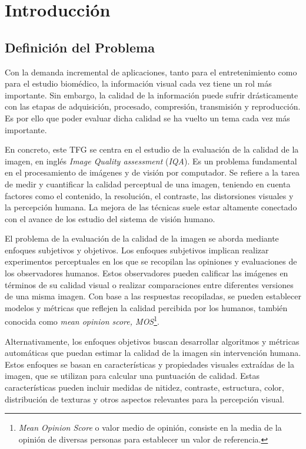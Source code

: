 \chapter{Introducción}
\section{Definición del Problema}   
Con la demanda incremental de aplicaciones, tanto para el entretenimiento 
como para el estudio biomédico, la información visual cada vez tiene un rol 
más importante. Sin embargo, la calidad de la información puede sufrir drásticamente
con las etapas de adquisición, procesado, compresión, transmisión y reproducción.
Es por ello que poder evaluar dicha calidad se ha vuelto un 
tema cada vez más importante\cite{VisualMedicalQualityBook}.

En concreto, este TFG se centra en el estudio de la evaluación de la calidad de la imagen,
en inglés \emph{Image Quality assessment} (\emph{IQA})\cite{MinkowskiFailure}.
Es un problema fundamental en el procesamiento de imágenes y de visión 
por computador. Se refiere a la tarea de medir y cuantificar 
la calidad perceptual de una imagen, 
teniendo en cuenta factores como el contenido, la resolución, 
el contraste, las distorsiones visuales y la percepción humana. 
La mejora de las técnicas suele estar altamente conectado con el avance 
de los estudio del sistema de visión humano\cite{Wang2006ModernIQ}.
 
El problema de la evaluación de la calidad de la imagen se aborda mediante enfoques 
subjetivos y objetivos. Los enfoques subjetivos implican realizar experimentos 
perceptuales en los que se recopilan las opiniones y evaluaciones de los observadores 
humanos. Estos observadores pueden calificar las imágenes en términos de su 
calidad visual o realizar comparaciones entre diferentes versiones de una misma imagen. 
Con base a las respuestas recopiladas, se pueden establecer modelos y 
métricas que reflejen la calidad percibida por los humanos, también conocida
como \emph{mean opinion score, MOS}\footnote{
\emph{Mean Opinion Score} o valor medio de opinión, consiste en 
la media de la opinión de diversas personas para establecer un valor de referencia. 
}.

Alternativamente, los enfoques objetivos buscan desarrollar algoritmos y métricas 
automáticas que puedan estimar la calidad de la imagen sin intervención humana. 
Estos enfoques se basan en características y propiedades visuales extraídas de la 
imagen, que se utilizan para calcular una puntuación de calidad. Estas características 
pueden incluir medidas de nitidez, contraste, estructura, color, distribución de 
texturas y otros aspectos relevantes para la percepción visual.
 
